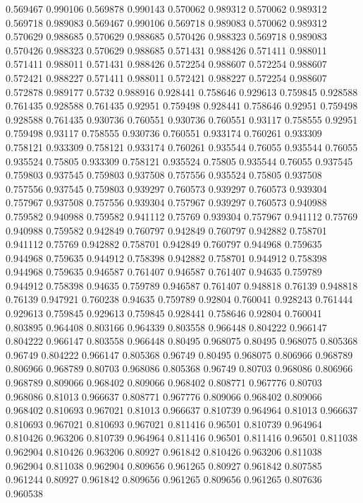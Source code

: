 0.569467 0.990106
0.569878 0.990143
0.570062 0.989312
0.570062 0.989312
0.569718 0.989083
0.569467 0.990106
0.569718 0.989083
0.570062 0.989312
0.570629 0.988685
0.570629 0.988685
0.570426 0.988323
0.569718 0.989083
0.570426 0.988323
0.570629 0.988685
0.571431 0.988426
0.571411 0.988011
0.571411 0.988011
0.571431 0.988426
0.572254 0.988607
0.572254 0.988607
0.572421 0.988227
0.571411 0.988011
0.572421 0.988227
0.572254 0.988607
0.572878 0.989177
0.5732 0.988916
0.928441 0.758646
0.929613 0.759845
0.928588 0.761435
0.928588 0.761435
0.92951 0.759498
0.928441 0.758646
0.92951 0.759498
0.928588 0.761435
0.930736 0.760551
0.930736 0.760551
0.93117 0.758555
0.92951 0.759498
0.93117 0.758555
0.930736 0.760551
0.933174 0.760261
0.933309 0.758121
0.933309 0.758121
0.933174 0.760261
0.935544 0.76055
0.935544 0.76055
0.935524 0.75805
0.933309 0.758121
0.935524 0.75805
0.935544 0.76055
0.937545 0.759803
0.937545 0.759803
0.937508 0.757556
0.935524 0.75805
0.937508 0.757556
0.937545 0.759803
0.939297 0.760573
0.939297 0.760573
0.939304 0.757967
0.937508 0.757556
0.939304 0.757967
0.939297 0.760573
0.940988 0.759582
0.940988 0.759582
0.941112 0.75769
0.939304 0.757967
0.941112 0.75769
0.940988 0.759582
0.942849 0.760797
0.942849 0.760797
0.942882 0.758701
0.941112 0.75769
0.942882 0.758701
0.942849 0.760797
0.944968 0.759635
0.944968 0.759635
0.944912 0.758398
0.942882 0.758701
0.944912 0.758398
0.944968 0.759635
0.946587 0.761407
0.946587 0.761407
0.94635 0.759789
0.944912 0.758398
0.94635 0.759789
0.946587 0.761407
0.948818 0.76139
0.948818 0.76139
0.947921 0.760238
0.94635 0.759789
0.92804 0.760041
0.928243 0.761444
0.929613 0.759845
0.929613 0.759845
0.928441 0.758646
0.92804 0.760041
0.803895 0.964408
0.803166 0.964339
0.803558 0.966448
0.804222 0.966147
0.804222 0.966147
0.803558 0.966448
0.80495 0.968075
0.80495 0.968075
0.805368 0.96749
0.804222 0.966147
0.805368 0.96749
0.80495 0.968075
0.806966 0.968789
0.806966 0.968789
0.80703 0.968086
0.805368 0.96749
0.80703 0.968086
0.806966 0.968789
0.809066 0.968402
0.809066 0.968402
0.808771 0.967776
0.80703 0.968086
0.81013 0.966637
0.808771 0.967776
0.809066 0.968402
0.809066 0.968402
0.810693 0.967021
0.81013 0.966637
0.810739 0.964964
0.81013 0.966637
0.810693 0.967021
0.810693 0.967021
0.811416 0.96501
0.810739 0.964964
0.810426 0.963206
0.810739 0.964964
0.811416 0.96501
0.811416 0.96501
0.811038 0.962904
0.810426 0.963206
0.80927 0.961842
0.810426 0.963206
0.811038 0.962904
0.811038 0.962904
0.809656 0.961265
0.80927 0.961842
0.807585 0.961244
0.80927 0.961842
0.809656 0.961265
0.809656 0.961265
0.807636 0.960538
